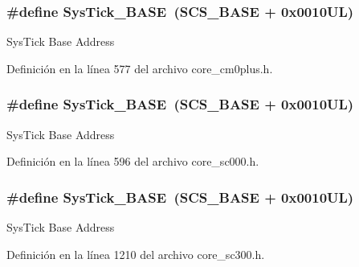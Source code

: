 \subsubsection[{\texorpdfstring{Sys\+Tick\+\_\+\+B\+A\+SE}{SysTick_BASE}}]{\setlength{\rightskip}{0pt plus 5cm}\#define Sys\+Tick\+\_\+\+B\+A\+SE~({\bf S\+C\+S\+\_\+\+B\+A\+SE} +  0x0010\+U\+L)}\hypertarget{group___c_m_s_i_s__core__base_ga58effaac0b93006b756d33209e814646}{}\label{group___c_m_s_i_s__core__base_ga58effaac0b93006b756d33209e814646}
Sys\+Tick Base Address 

Definición en la línea 577 del archivo core\+\_\+cm0plus.\+h.

\subsubsection[{\texorpdfstring{Sys\+Tick\+\_\+\+B\+A\+SE}{SysTick_BASE}}]{\setlength{\rightskip}{0pt plus 5cm}\#define Sys\+Tick\+\_\+\+B\+A\+SE~({\bf S\+C\+S\+\_\+\+B\+A\+SE} +  0x0010\+U\+L)}\hypertarget{group___c_m_s_i_s__core__base_ga58effaac0b93006b756d33209e814646}{}\label{group___c_m_s_i_s__core__base_ga58effaac0b93006b756d33209e814646}
Sys\+Tick Base Address 

Definición en la línea 596 del archivo core\+\_\+sc000.\+h.

\subsubsection[{\texorpdfstring{Sys\+Tick\+\_\+\+B\+A\+SE}{SysTick_BASE}}]{\setlength{\rightskip}{0pt plus 5cm}\#define Sys\+Tick\+\_\+\+B\+A\+SE~({\bf S\+C\+S\+\_\+\+B\+A\+SE} +  0x0010\+U\+L)}\hypertarget{group___c_m_s_i_s__core__base_ga58effaac0b93006b756d33209e814646}{}\label{group___c_m_s_i_s__core__base_ga58effaac0b93006b756d33209e814646}
Sys\+Tick Base Address 

Definición en la línea 1210 del archivo core\+\_\+sc300.\+h.


